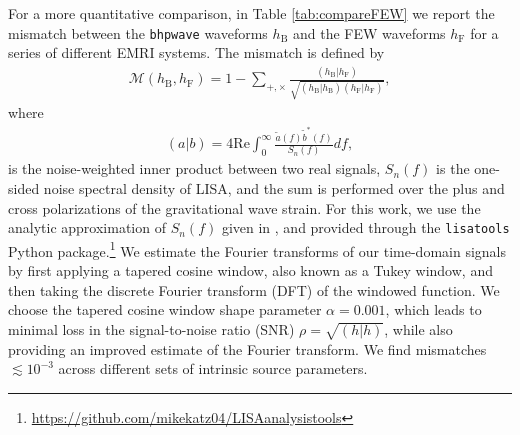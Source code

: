 \documentclass[%
 reprint,
 nofootinbib,
 amsmath,amssymb,
 aps,
 prd,
]{revtex4-2}
\begin{document}
For a more quantitative comparison, in Table \ref{tab:compareFEW} we report the mismatch between the \texttt{bhpwave} waveforms $h_\mathrm{B}$ and the FEW waveforms $h_\mathrm{F}$ for a series of different EMRI systems. The mismatch is defined by
\begin{align}
    \mathcal{M}(h_\mathrm{B}, h_\mathrm{F}) = 1 - \sum_{+,\times} \frac{\left(h_\mathrm{B} | h_\mathrm{F} \right)}{\sqrt{\left(h_\mathrm{B} | h_\mathrm{B} \right)\left(h_\mathrm{F} | h_\mathrm{F} \right)}},
\end{align}
where 
\begin{align}
    \left(a | b \right) = 4 \mathrm{Re} \int_0^\infty \frac{\tilde{a}(f)\tilde{b}^*(f)}{S_n(f)}df,
\end{align}
is the noise-weighted inner product between two real signals, $S_n(f)$ is the one-sided noise spectral density of LISA, and the sum is performed over the plus and cross polarizations of the gravitational wave strain. For this work, we use the analytic approximation of $S_n(f)$ given in \cite{RobsCornLiu19}, and provided through the \texttt{lisatools} Python package.\footnote{\href{https://github.com/mikekatz04/LISAanalysistools}{https://github.com/mikekatz04/LISAanalysistools}} We estimate the Fourier transforms of our time-domain signals by first applying a tapered cosine window, also known as a Tukey window, and then taking the discrete Fourier transform (DFT) of the windowed function. We choose the tapered cosine window shape parameter $\alpha = 0.001$, which leads to minimal loss in the signal-to-noise ratio (SNR) $\rho = \sqrt{(h|h)}$, while also providing an improved estimate of the Fourier transform. We find mismatches $\lesssim 10^{-3}$ across different sets of intrinsic source parameters.
\end{document}
